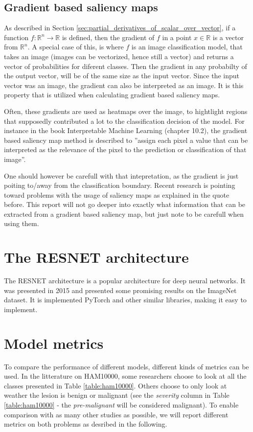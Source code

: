 \subsection{Gradient based saliency maps} \label{sec:gradiant_saliency_maps}
As described in Section \ref{sec:partial_derivatives_of_scalar_over_vector},
if a function $f: \mathbb{R}^n \rightarrow \mathbb{R}$ is defined,
then the gradient of $f$ in a point $x\in\mathbb{R}$ is a vector from $\mathbb{R}^n$.
A special case of this, is where $f$ is an image classification model, that takes
an image (images can be vectorized, hence still a vector) and returns a vector of probabilities for
diferent classes.
Then the gradient in any probabilty of the output vector, will be of the same size as the input vector.
Since the input vector was an image, the gradient can also be interpreted as an image.
It is this property that is utilized when calculating gradient based saliency maps.

Often, these gradients are used as heatmaps over the image, to hightlight regions that 
supposedly contributed a lot to the classification decision of the model. 
For instance in the book Interpretable Machine Learning (chapter 10.2)\cite{interpretable-machine-learning}, the gradient based 
saliency map method is described to
''assign each pixel a value that can be interpreted as the relevance of the pixel to the prediction or classification of that image''.

One should however be carefull with that intepretation, as the gradient is just poiting to/away from the classification boundary.
Recent research is pointing toward problems with the usage of saliency maps as explained in the quote before\cite{false-hope}.
This report will not go deeper into exactly what information that can be extracted from a gradient based saliency map,
but just note to be carefull when using them.

\section{The RESNET architecture}
The RESNET architecture is a popular architecture for deep neural networks.
It was presented in 2015 and presented some promising results on the ImageNet dataset\cite{RESNET-paper}.
It is implemented PyTorch and other similar libraries, making it easy to implement.

\section{Model metrics}
To compare the performance of different models, different kinds of metrics can be used.
In the litterature on HAM10000, some researchers choose to look at all the classes presented 
in Table \ref{table:ham10000}.
Others choose to only look at weather the lesion is benign or malignant 
(see the \textit{severity} column in Table \ref{table:ham10000} - the \textit{pre-malignant} will be considered malignant).
To enable comparison with as many other studies as possible, we will report different metrics
on both problems as desribed in the following.
